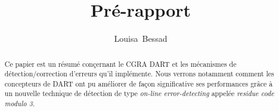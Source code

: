 \documentclass{journal}%
\title{Pré-rapport}
\author{Louisa~Bessad}%
\begin{document}
\maketitle
\begin{abstract}
Ce papier est un résumé conçernant le CGRA DART et les mécanismes de
détection/correction d'erreurs qu'il implémente. Nous verrons notamment
comment les concepteurs de DART ont pu améliorer de façon significative ses
performances grâce à un nouvelle technique de détection de type
\emph{on-line error-detecting} appelée \emph{residue code modulo 3}.
\end{abstract}



\begin{thebibliography}{1}
\end{thebibliography}
\end{document}
